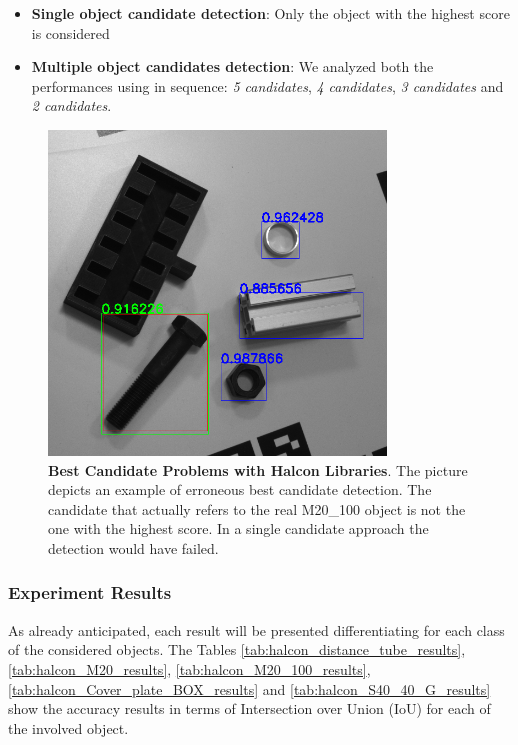 \begin{itemize}
	\item \textbf{Single object candidate detection}: Only the object with the highest score is considered
	\item \textbf{Multiple object candidates detection}: We analyzed both the performances using in sequence: \emph{5 candidates}, \emph{4 candidates}, \emph{3 candidates} and \emph{2 candidates}.
\end{itemize}

\begin{figure}
    \centering
    \includegraphics[width=0.8\textwidth]{figures/4_experiments/m20_100_halcon_detection_problems}
    \caption{\textbf{Best Candidate Problems with Halcon Libraries}. The picture depicts an example of erroneous best candidate detection. The candidate that actually refers to the real M20\_100 object is not the one with the highest score. In a single candidate approach the detection would have failed.}
    \label{fig:m20_100_halcon_detection_problems}
\end{figure}

\subsubsection{Experiment Results}
As already anticipated, each result will be presented differentiating for each class of the considered objects. The Tables \ref{tab:halcon_distance_tube_results}, \ref{tab:halcon_M20_results}, \ref{tab:halcon_M20_100_results}, \ref{tab:halcon_Cover_plate_BOX_results} and \ref{tab:halcon_S40_40_G_results} show the accuracy results in terms of Intersection over Union (IoU) for each of the involved object.

